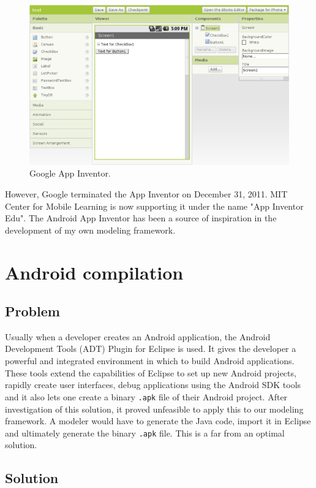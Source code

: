 \begin{figure}[h!]
\centering
\includegraphics[width=1.0\textwidth]{images/chap4_app_inventor.png}
\caption{Google App Inventor.}
\label{fig:app_inventor}
\end{figure}

However, Google terminated the App Inventor on December 31, 2011. MIT Center for Mobile Learning is now supporting it under the name "App Inventor Edu". The Android App Inventor has been a source of inspiration in the development of my own modeling framework. 

\section{Android compilation}

\subsection{Problem}

Usually when a developer creates an Android application, the Android Development Tools (ADT) 
Plugin for Eclipse is used. It gives the developer a powerful and integrated environment in which to build Android applications. These tools extend the capabilities of Eclipse to set up new Android projects, rapidly create user interfaces, debug applications using the Android SDK tools and it also lets one create a binary \texttt{.apk} file of their Android project. After investigation of this solution, it proved unfeasible to apply this to our modeling framework. A modeler would have to generate the Java code, import it in Eclipse and ultimately generate the binary \texttt{.apk} file. This is a far from an optimal solution.

\subsection{Solution}


